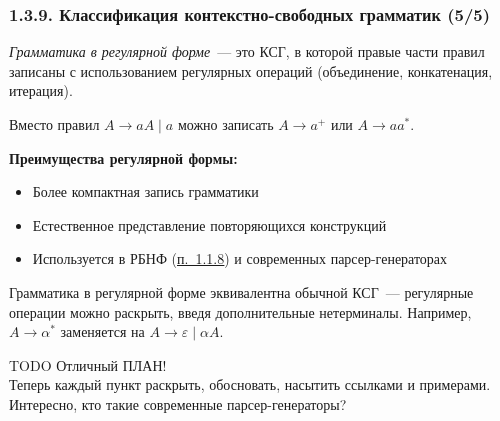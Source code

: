 \documentclass[mathserif,12pt,aspectratio=169]{beamer}
\renewcommand{\index}[1]{}
\def\NB#1{{\bf\color{brown}#1}}
\def\odmkey#1#2{{\it\color{red} #1}\index{#2}}
\def\DMref#1#2{{\color{blue}\underline{\hyperlink{#2}{#1}}}}
\def\TODO#1{{\color{gray} TODO {#1}}}
\begin{document}
\begin{frame}
\frametitle{1.3.9. Классификация контекстно-свободных грамматик (5/5)}

\odmkey{Грамматика в регулярной форме}{Грамматика!в регулярной форме}~--- 
это КСГ, в которой правые части правил записаны с использованием 
регулярных операций (объединение, конкатенация, итерация).

\begin{example}
Вместо правил $A \to aA \mid a$ можно записать $A \to a^+$ или $A \to aa^*$.
\end{example}

\NB{Преимущества регулярной формы:}
\begin{itemize}
\item Более компактная запись грамматики
\item Естественное представление повторяющихся конструкций
\item Используется в РБНФ (\DMref{п.~1.1.8}{1.1.8.}) и современных парсер-генераторах
\end{itemize}

\begin{remark}
Грамматика в регулярной форме эквивалентна обычной КСГ~--- 
регулярные операции можно раскрыть, введя дополнительные нетерминалы.
Например, $A \to \alpha^*$ заменяется на $A \to \varepsilon \mid \alpha A$.
\end{remark}

\bigskip
\TODO{Отличный ПЛАН! \\
Теперь каждый пункт раскрыть, обосновать, насытить ссылками и примерами. \\
Интересно, кто такие современные парсер-генераторы?}

\end{frame}
\end{document}
